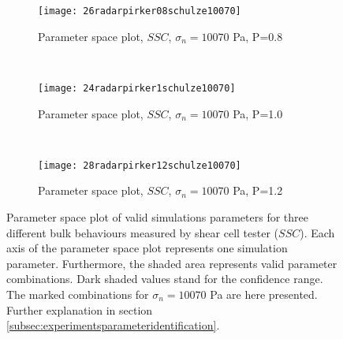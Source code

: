 \documentclass[review]{elsarticle}
\begin{document}
\begin{figure}[htp] \centering
        \begin{subfigure}[b]{0.5\columnwidth}
        \texttt{[image: 26radarpirker08schulze10070]}
        \caption{Parameter space plot, $SSC$, $\sigma_n=10070$ Pa, P=0.8}
        \label{fig:26radarpirker08schulze10070} 
    \end{subfigure}\\
     \begin{subfigure}[b]{0.5\columnwidth}
        \texttt{[image: 24radarpirker1schulze10070]}
        \caption{Parameter space plot, $SSC$, $\sigma_n=10070$ Pa, P=1.0}
        \label{fig:24radarpirker1schulze10070}
    \end{subfigure} \\
        \begin{subfigure}[b]{0.5\columnwidth}
        \texttt{[image: 28radarpirker12schulze10070]}
        \caption{Parameter space plot, $SSC$, $\sigma_n=10070$ Pa, P=1.2}
        \label{fig:28radarpirker12schulze10070} 
    \end{subfigure}
    \caption[Parameter space plot of valid simulations parameters for three different
    bulk behaviours measured by SSC]{Parameter space plot of valid simulations
    parameters for three different bulk behaviours measured by shear cell tester ($SSC$).
    Each axis of the parameter space plot represents one simulation parameter.
    Furthermore, the shaded area represents valid parameter combinations.
    Dark shaded values stand for the confidence range.
	The marked combinations for $\sigma_n=10070$ Pa are here presented.
    Further explanation in
   section \ref{subsec:experimentsparameteridentification}.
   }
    \label{fig:29schulzeradarandcloud}
\end{figure}
\end{document}
